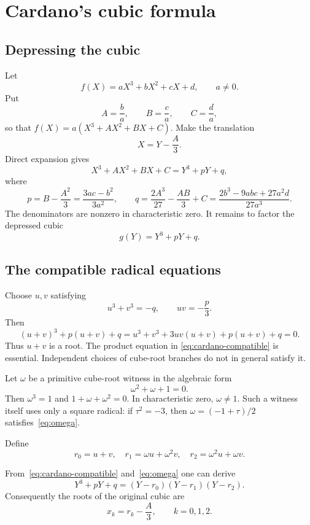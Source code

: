 \section{Cardano's cubic formula}
\label{sec:cubic}

\subsection{Depressing the cubic}

Let
\[
 f(X)=aX^3+bX^2+cX+d,
 \qquad a\ne0.
\]
Put
\[
 A=\frac ba,\qquad B=\frac ca,\qquad C=\frac da,
\]
so that $f(X)=a(X^3+AX^2+BX+C)$.  Make the translation
\[
 X=Y-\frac A3.
\]
Direct expansion gives
\[
 X^3+AX^2+BX+C=Y^3+pY+q,
 \tag{C1}\label{eq:cubic-depress}
\]
where
\[
 p=B-\frac{A^2}{3}
   =\frac{3ac-b^2}{3a^2},
 \qquad
 q=\frac{2A^3}{27}-\frac{AB}{3}+C
   =\frac{2b^3-9abc+27a^2d}{27a^3}.
 \tag{C2}\label{eq:cubic-pq}
\]
The denominators are nonzero in characteristic zero.  It remains to factor the
depressed cubic
\[
 g(Y)=Y^3+pY+q.
\]

\subsection{The compatible radical equations}

Choose $u,v$ satisfying
\[
 u^3+v^3=-q,
 \qquad
 uv=-\frac p3.
 \tag{C3}\label{eq:cardano-compatible}
\]
Then
\[
 (u+v)^3+p(u+v)+q
 =u^3+v^3+3uv(u+v)+p(u+v)+q=0.
\]
Thus $u+v$ is a root.  The product equation in
\eqref{eq:cardano-compatible} is essential.  Independent choices of cube-root
branches do not in general satisfy it.

Let $\omega$ be a primitive cube-root witness in the algebraic form
\[
 \omega^2+\omega+1=0.
 \tag{C4}\label{eq:omega}
\]
Then $\omega^3=1$ and $1+\omega+\omega^2=0$.  In characteristic zero,
$\omega\ne1$.  Such a witness itself uses only a square radical: if
$\tau^2=-3$, then $\omega=(-1+\tau)/2$ satisfies~\eqref{eq:omega}.

Define
\[
 r_0=u+v,
 \quad
 r_1=\omega u+\omega^2v,
 \quad
 r_2=\omega^2u+\omega v.
 \tag{C5}\label{eq:cardano-roots-depressed}
\]

\begin{theorem}
\label{thm:cardano-factorization}
From~\eqref{eq:cardano-compatible} and~\eqref{eq:omega} one can derive
\[
 Y^3+pY+q=(Y-r_0)(Y-r_1)(Y-r_2).
 \tag{C6}\label{eq:cardano-factorization}
\]
Consequently the roots of the original cubic are
\[
 x_k=r_k-\frac A3,
 \qquad k=0,1,2.
 \tag{C7}\label{eq:cardano-original-roots}
\]
\end{theorem}

